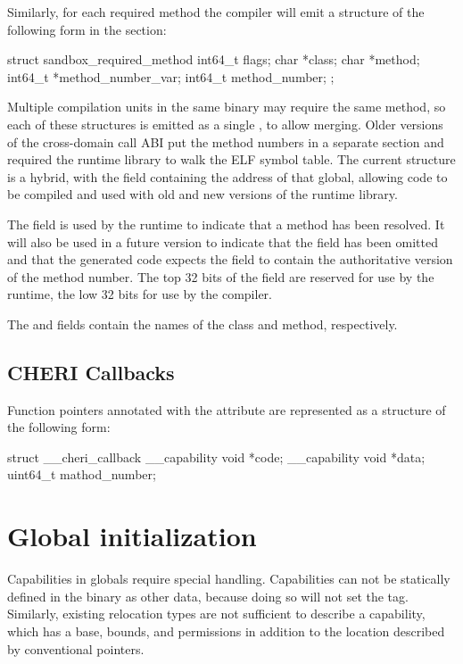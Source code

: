Similarly, for each required method the compiler will emit a structure of the following form in the  section:

\begin{csnippet}
struct sandbox_required_method
{
	int64_t   flags;
	char     *class;
	char     *method;
	int64_t  *method_number_var;
	int64_t   method_number;
};
\end{csnippet}

Multiple compilation units in the same binary may require the same method, so each of these structures is emitted as a single , to allow merging.
Older versions of the cross-domain call ABI put the method numbers in a separate section and required the runtime library to walk the ELF symbol table.
The current structure is a hybrid, with the  field containing the address of that global, allowing code to be compiled and used with old and new versions of the runtime library.

The  field is used by the runtime to indicate that a method has been resolved.
It will also be used in a future version to indicate that the  field has been omitted and that the generated code expects the  field to contain the authoritative version of the method number.
The top 32 bits of the  field are reserved for use by the runtime, the low 32 bits for use by the compiler.

The  and  fields contain the names of the class and method, respectively.

\subsection{CHERI Callbacks}

Function pointers annotated with the  attribute are represented as a structure of the following form:

\begin{csnippet}
struct __cheri_callback
{
	__capability void *code;
	__capability void *data;
	uint64_t           mathod_number;
}
\end{csnippet}

\section{Global initialization}

Capabilities in globals require special handling.
Capabilities can not be statically defined in the binary as other data, because doing so will not set the tag.
Similarly, existing relocation types are not sufficient to describe a capability, which has a base, bounds, and permissions in addition to the location described by conventional pointers.

